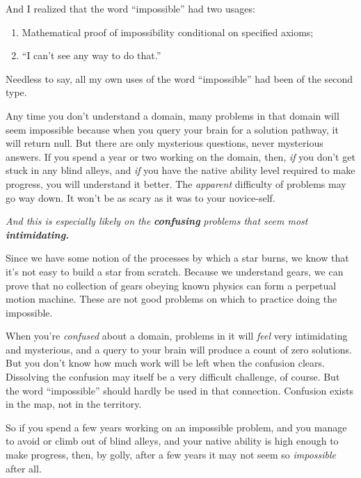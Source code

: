 {
 And I realized that the word
``impossible'' had two usages:}

\begin{enumerate}
\item {
 Mathematical proof of impossibility conditional on specified
axioms;}

\item {
 ``I can't see any way to do
  that.''}
\end{enumerate}

{
 Needless to say, all my own uses of the word
``impossible'' had been of the
second type.}

{
 Any time you don't understand a domain, many
problems in that domain will seem impossible because when you query
your brain for a solution pathway, it will return null. But there are
only mysterious questions, never mysterious answers. If you spend a
year or two working on the domain, then, \textit{if} you
don't get stuck in any blind alleys, and \textit{if}
you have the native ability level required to make progress, you will
understand it better. The \textit{apparent} difficulty of problems may
go way down. It won't be as scary as it was to your
novice-self.}

{
 \textit{And this is especially likely on the
}\textbf{\textit{confusing}} \textit{problems that seem most}
\textbf{\textit{intimidating.}}}

{
 Since we have some notion of the processes by which a star burns,
we know that it's not easy to build a star from
scratch. Because we understand gears, we can prove that no collection
of gears obeying known physics can form a perpetual motion machine.
These are not good problems on which to practice doing the impossible.}

{
 When you're \textit{confused} about a domain,
problems in it will \textit{feel} very intimidating and mysterious, and
a query to your brain will produce a count of zero solutions. But you
don't know how much work will be left when the
confusion clears. Dissolving the confusion may itself be a very
difficult challenge, of course. But the word
``impossible'' should hardly be used
in that connection. Confusion exists in the map, not in the territory.}

{
 So if you spend a few years working on an impossible problem, and
you manage to avoid or climb out of blind alleys, and your native
ability is high enough to make progress, then, by golly, after a few
years it may not seem so \textit{impossible} after all.}

